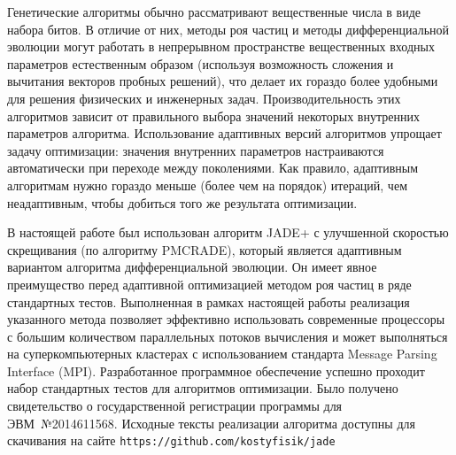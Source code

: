 Генетические алгоритмы обычно рассматривают вещественные числа в виде
набора битов.  В отличие от них, методы роя частиц и методы
дифференциальной эволюции могут работать в непрерывном пространстве
вещественных входных параметров естественным образом (используя
возможность сложения и вычитания векторов пробных решений), что делает
их гораздо более удобными для решения физических и инженерных
задач.  Производительность этих алгоритмов зависит от правильного
выбора значений некоторых внутренних параметров
алгоритма.  Использование адаптивных версий алгоритмов упрощает задачу
оптимизации: значения внутренних параметров настраиваются
автоматически при переходе между поколениями. Как правило, адаптивным
алгоритмам нужно гораздо меньше (более чем на порядок) итераций, чем
неадаптивным, чтобы добиться того же результата оптимизации.

В настоящей работе был использован алгоритм JADE+ с улучшенной
скоростью скрещивания (по алгоритму PMCRADE), который является
адаптивным вариантом алгоритма дифференциальной эволюции. Он имеет
явное преимущество перед адаптивной оптимизацией методом роя частиц в
ряде стандартных тестов.  Выполненная в рамках настоящей работы
реализация указанного метода позволяет эффективно использовать
современные процессоры с большим количеством параллельных потоков
вычисления и может выполняться на суперкомпьютерных кластерах с
использованием стандарта Message Parsing Interface (MPI).
Разработанное программное обеспечение успешно проходит набор
стандартных тестов для алгоритмов оптимизации.  Было получено
свидетельство о государственной регистрации программы для
ЭВМ~№2014611568.  Исходные тексты реализации алгоритма доступны для
скачивания на сайте \verb+https://github.com/kostyfisik/jade+

